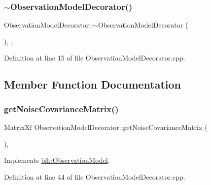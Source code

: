 \subsubsection{\texorpdfstring{$\sim$\+Observation\+Model\+Decorator()}{~ObservationModelDecorator()}}
{\footnotesize\ttfamily Observation\+Model\+Decorator\+::$\sim$\+Observation\+Model\+Decorator (\begin{DoxyParamCaption}{ }\end{DoxyParamCaption})\hspace{0.3cm}{\ttfamily [protected]}, {\ttfamily [virtual]}, {\ttfamily [noexcept]}}



Definition at line 15 of file Observation\+Model\+Decorator.\+cpp.



\subsection{Member Function Documentation}
\mbox{\label{classbfl_1_1ObservationModelDecorator_a60faf028d6c83e02cf0a88c58064abf2}} 
\subsubsection{\texorpdfstring{get\+Noise\+Covariance\+Matrix()}{getNoiseCovarianceMatrix()}}
{\footnotesize\ttfamily Matrix\+Xf Observation\+Model\+Decorator\+::get\+Noise\+Covariance\+Matrix (\begin{DoxyParamCaption}{ }\end{DoxyParamCaption})\hspace{0.3cm}{\ttfamily [override]}, {\ttfamily [virtual]}}



Implements \mbox{\hyperlink{classbfl_1_1ObservationModel_a63357b1456a4a5387e55d31ddb0b9b50}{bfl\+::\+Observation\+Model}}.



Definition at line 44 of file Observation\+Model\+Decorator.\+cpp.

\mbox{\label{classbfl_1_1ObservationModelDecorator_a3e8cecfbd2402944d1f9e4682d5fd9a0}} 
